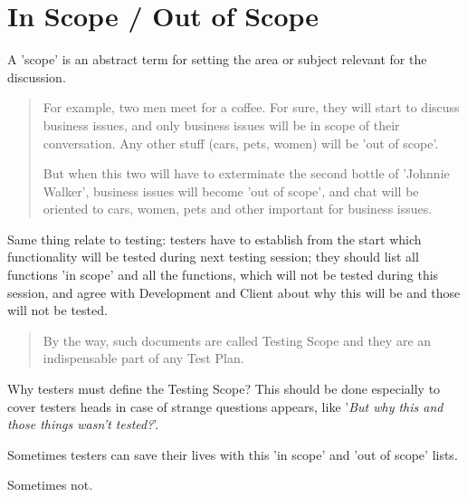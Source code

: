 \section{In Scope / Out of Scope}
\label{sec:In Scope / Out of Scope}

A 'scope' is an abstract term for setting the area or subject relevant for the discussion.

\begin{quote}
For example, two men meet for a coffee. For sure, they will start to discuss business issues, and only business issues will be in scope of their conversation. Any other stuff (cars, pets, women) will be 'out of scope'.

But when this two will have to exterminate the second bottle of 'Johnnie Walker', business issues will become 'out of scope', and chat will be oriented to cars, women, pets and other important for business issues.                                                                                                                                                                                                                     \end{quote} 

Same thing relate to testing: testers have to establish from the start which functionality will be tested during next testing session; they should list all functions 'in scope' and all the functions, which will not be tested during this session, and agree with Development and Client about why this will be and those will not be tested.

\begin{quote}
By the way, such documents are called Testing Scope and they are an indispensable part of any Test Plan.\end{quote} 

Why testers must define the Testing Scope? This should be done especially to cover testers heads in case of strange questions appears, like '\textit{But why this and those things wasn't tested?}'. 

Sometimes testers can save their lives with this 'in scope' and 'out of scope' lists.

Sometimes not.
